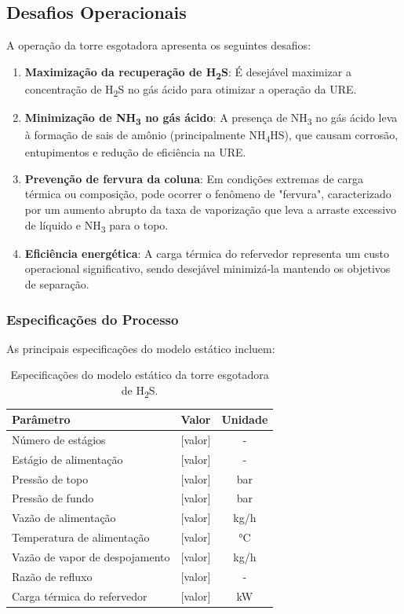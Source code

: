 \subsection{Desafios Operacionais}

A operação da torre esgotadora apresenta os seguintes desafios:

\begin{enumerate}
  \item \textbf{Maximização da recuperação de H\textsubscript{2}S}: É desejável maximizar a concentração de H\textsubscript{2}S no gás ácido para otimizar a operação da URE.
  \item \textbf{Minimização de NH\textsubscript{3} no gás ácido}: A presença de NH\textsubscript{3} no gás ácido leva à formação de sais de amônio (principalmente NH\textsubscript{4}HS), que causam corrosão, entupimentos e redução de eficiência na URE.
  \item \textbf{Prevenção de fervura da coluna}: Em condições extremas de carga térmica ou composição, pode ocorrer o fenômeno de "fervura", caracterizado por um aumento abrupto da taxa de vaporização que leva a arraste excessivo de líquido e NH\textsubscript{3} para o topo.
  \item \textbf{Eficiência energética}: A carga térmica do refervedor representa um custo operacional significativo, sendo desejável minimizá-la mantendo os objetivos de separação.
\end{enumerate}



\subsubsection{Especificações do Processo}

As principais especificações do modelo estático incluem:

\begin{table}[H]
  \centering
  \caption{Especificações do modelo estático da torre esgotadora de H\textsubscript{2}S.}
  \label{tab:spec_estatico}
  \begin{tabular}{lcc}
    \toprule
    \textbf{Parâmetro} & \textbf{Valor} & \textbf{Unidade} \\
    \midrule
    Número de estágios & [valor] & - \\
    Estágio de alimentação & [valor] & - \\
    Pressão de topo & [valor] & bar \\
    Pressão de fundo & [valor] & bar \\
    Vazão de alimentação & [valor] & kg/h \\
    Temperatura de alimentação & [valor] & \si{\celsius} \\
    Vazão de vapor de despojamento & [valor] & kg/h \\
    Razão de refluxo & [valor] & - \\
    Carga térmica do refervedor & [valor] & kW \\
    \bottomrule
  \end{tabular}
\end{table}

